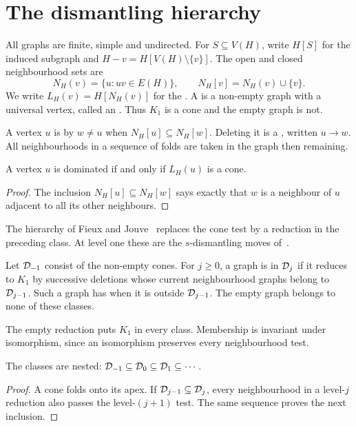 \section{The dismantling hierarchy}\label{sec:prelim}
All graphs are finite, simple and undirected. For $S\subseteq V(H)$, write
$H[S]$ for the induced subgraph and $H-v=H[V(H)\setminus\{v\}]$.
The open and closed neighbourhood sets are
\[
 N_H(v)=\{u:uv\in E(H)\},\qquad N_H[v]=N_H(v)\cup\{v\}.
\]
We write $L_H(v)=H[N_H(v)]$ for the .
A  is a non-empty graph with a universal vertex, called an
. Thus $K_1$ is a cone and the empty graph is not.

A vertex $u$ is  by $w\ne u$ when
$N_H[u]\subseteq N_H[w]$. Deleting it is a , written $u\to w$.
All neighbourhoods in a sequence of folds are taken in the graph then remaining.

\begin{lemma}\label{lem:dom}
A vertex $u$ is dominated if and only if $L_H(u)$ is a cone.
\end{lemma}
\begin{proof}
The inclusion $N_H[u]\subseteq N_H[w]$ says exactly that $w$ is a
neighbour of $u$ adjacent to all its other neighbours.
\end{proof}

The hierarchy of Fieux and Jouve~\cite{FJ2020} replaces the cone test by
a reduction in the preceding class. At level one these are the
$s$-dismantling moves of~\cite{BFJ2010}.
\begin{definition}\label{def:hierarchy}
Let $\mathcal D_{-1}$ consist of the non-empty cones. For $j\geq0$, a graph is
in $\mathcal D_j$ if it reduces to $K_1$ by successive deletions whose current
neighbourhood graphs belong to $\mathcal D_{j-1}$. Such a graph has
 when it is outside $\mathcal D_{j-1}$.
The empty graph belongs to none of these classes.
\end{definition}
The empty reduction puts $K_1$ in every class. Membership is invariant under
isomorphism, since an isomorphism preserves every neighbourhood test.

\begin{lemma}\label{lem:inclusions}
The classes are nested: $\mathcal D_{-1}\subseteq\mathcal D_0\subseteq\mathcal D_1\subseteq\cdots$.
\end{lemma}
\begin{proof}
A cone folds onto its apex. If $\mathcal D_{j-1}\subseteq\mathcal D_j$, every
neighbourhood in a level-$j$ reduction also passes the level-$(j+1)$ test.
The same sequence proves the next inclusion.
\end{proof}

